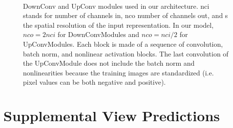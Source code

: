 \begin{appendices}
\begin{figure}
    \begin{center}
    \\
    \end{center}
    \caption{
    \protect{} DownConv and \protect{} UpConv modules used in our architecture. nci stands for number of channels in, nco number of channels out, and s the spatial resolution of the input representation. In our model, $nco = 2 nci$ for DownConvModules and $nco = nci/2$ for UpConvModules. Each block is made of a sequence of convolution, batch norm, and nonlinear activation blocks. The last convolution of the UpConvModule does not include the batch norm and nonlinearities because the training images are standardized (i.e. pixel values can be both negative and positive).
    }
    \label{fig:cib-ae_modules}
\end{figure}

\chapter{Supplemental View Predictions} \label{ch:app-predictions}

\end{appendices}
